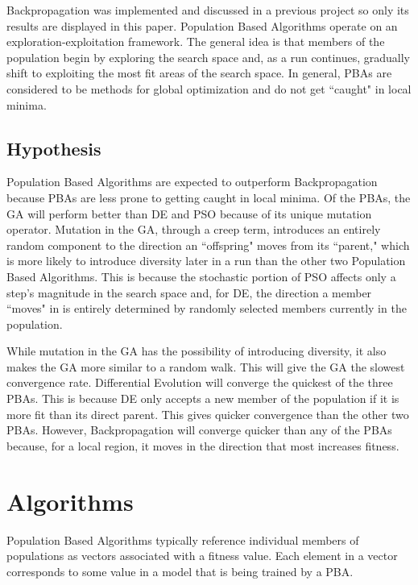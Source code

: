 \documentclass[twoside,11pt]{article}
\begin{document}
	Backpropagation was implemented and discussed in a previous project so only its results are displayed in this paper. Population Based Algorithms operate on an exploration-exploitation framework.
	The general idea is that members of the population begin by exploring the search space and, as a run continues, gradually shift to exploiting the most fit areas of the search space. 
	In general, PBAs are considered to be methods for global optimization and do not get ``caught" in local minima.

\subsection{Hypothesis}

	Population Based Algorithms are expected to outperform Backpropagation because PBAs are less prone to getting caught in local minima.
	Of the PBAs, the GA will perform better than DE and PSO because of its unique mutation operator. 
	Mutation in the GA, through a creep term, introduces an entirely random component to the direction an ``offspring" moves from its ``parent," which is more likely to introduce diversity later in a run than the other two Population Based Algorithms. 
	This is because the stochastic portion of PSO affects only a step's magnitude in the search space and, for DE, the direction a member ``moves" in is entirely determined by randomly selected members currently in the population.
	
	While mutation in the GA has the possibility of introducing diversity, it also makes the GA more similar to a random walk. This will give the GA the slowest convergence rate. 
	Differential Evolution will converge the quickest of the three PBAs. This is because DE only accepts a new member of the population if it is more fit than its direct parent. 
	This gives quicker convergence than the other two PBAs. However, Backpropagation will converge quicker than any of the PBAs because, for a local region, it moves in the direction that most increases fitness.

\section{Algorithms}

	Population Based Algorithms typically reference individual members of populations as vectors associated with a fitness value. Each element in a vector corresponds to some value in a model that is being trained by a PBA.
\end{document}
